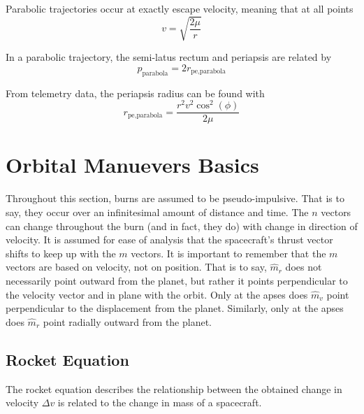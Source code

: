 \documentclass{article}
\begin{document}
\bigskip
Parabolic trajectories occur at exactly escape velocity, meaning that at all points
$$v=\sqrt{\frac{2\mu}{r}}$$

\bigskip
In a parabolic trajectory, the semi-latus rectum and periapsis are related by
$$p_\text{parabola}=2r_\text{pe,parabola}$$

\bigskip
From telemetry data, the periapsis radius can be found with
$$r_\text{pe,parabola}=\frac{r^2v^2\cos^2(\phi)}{2\mu}$$

\pagebreak
\section{Orbital Manuevers Basics}

Throughout this section, burns are assumed to be pseudo-impulsive. That is to say, they occur over an infinitesimal amount of distance and time. The $n$ vectors can change throughout the burn (and in fact, they do) with change in direction of velocity. It is assumed for ease of analysis that the spacecraft's thrust vector shifts to keep up with the $m$ vectors. It is important to remember that the $m$ vectors are based on velocity, not on position. That is to say, $\hat{m}_r$ does not necessarily point outward from the planet, but rather it points perpendicular to the velocity vector and in plane with the orbit. Only at the apses does $\hat{m}_v$ point perpendicular to the displacement from the planet. Similarly, only at the apses does $\hat{m}_r$ point radially outward from the planet.

\bigskip\bigskip
\subsection{Rocket Equation}

The rocket equation describes the relationship between the obtained change in velocity $\Delta{}v$ is related to the change in mass of a spacecraft.
\end{document}
